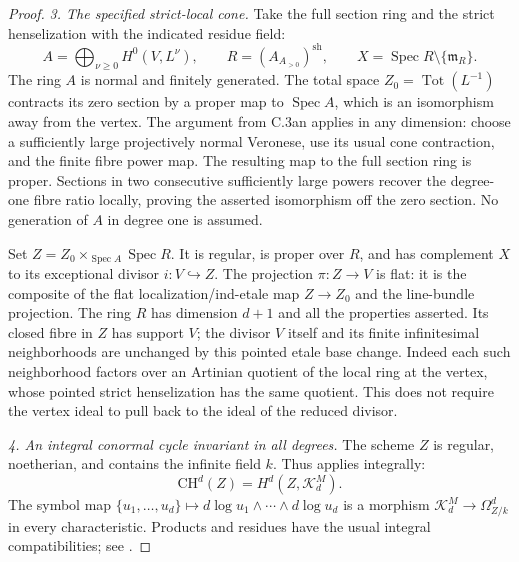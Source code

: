 \begin{proof}
\emph{3. The specified strict-local cone.}
Take the full section ring and the strict henselization with
the indicated residue field:
\[
 A=\bigoplus_{\nu\ge0}H^0(V,L^\nu),\qquad
 R=(A_{A_{>0}})^{\mathrm{sh}},\qquad
 X=\operatorname{Spec}R\setminus\{\mathfrak m_R\}.
 \tag{C.3as.17}
\]
The ring $A$ is normal and finitely generated. The total space
$Z_0=\operatorname{Tot}(L^{-1})$ contracts its zero section by
a proper map to $\operatorname{Spec}A$, which is an isomorphism
away from the vertex. The argument from C.3an applies in any
dimension: choose a sufficiently large projectively normal
Veronese, use its usual cone contraction, and the finite fibre
power map. The resulting map to the full section ring is proper.
Sections in two consecutive sufficiently large powers recover
the degree-one fibre ratio locally, proving the asserted
isomorphism off the zero section. No generation of $A$ in
degree one is assumed.

Set $Z=Z_0\times_{\operatorname{Spec}A}\operatorname{Spec}R$.
It is regular, is proper over $R$, and has complement $X$ to
its exceptional divisor $i:V\hookrightarrow Z$. The projection
$\pi:Z\to V$ is flat: it is the composite of the flat
localization/ind-etale map $Z\to Z_0$ and the line-bundle
projection. The ring $R$ has dimension $d+1$ and all the
properties asserted. Its closed fibre in $Z$ has support $V$;
the divisor $V$ itself and its finite infinitesimal neighborhoods
are unchanged by this pointed etale base change. Indeed each such
neighborhood factors over an Artinian quotient of the local ring
at the vertex, whose pointed strict henselization has the same
quotient. This does not require the vertex ideal to pull back to
the ideal of the reduced divisor.

\emph{4. An integral conormal cycle invariant in all degrees.}
The scheme $Z$ is regular, noetherian, and contains the
infinite field $k$. Thus
\citet[Theorems~7.1 and 7.5, author pp.~21--22]{cyKerz2009Milnor}
applies integrally:
\[
             \mathrm{CH}^d(Z)=H^d(Z,\mathcal K_d^M).
 \tag{C.3as.18}
\]
The symbol map
$\{u_1,\ldots,u_d\}\mapsto d\log u_1\wedge\cdots\wedge d\log u_d$
is a morphism $\mathcal K_d^M\to\Omega^d_{Z/k}$ in every
characteristic. Products and residues have the usual integral
compatibilities; see
\citet[Sections~3--4, pp.~557--560, especially the residue
squares and equation~(24)]{cyBraunling2013}.


\end{proof}
